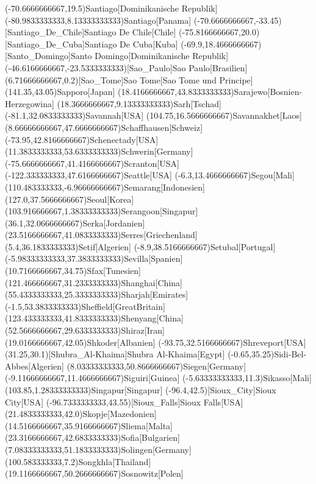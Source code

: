 \mapput(-70.6666666667,19.5){Santiago}[Dominikanische Republik]
\mapput(-80.9833333333,8.13333333333){Santiago}[Panama]
\mapput(-70.6666666667,-33.45)[Santiago_De_Chile]{Santiago De Chile}[Chile]
\mapput(-75.8166666667,20.0)[Santiago_De_Cuba]{Santiago De Cuba}[Kuba]
\mapput(-69.9,18.4666666667)[Santo_Domingo]{Santo Domingo}[Dominikanische Republik]
\mapput(-46.6166666667,-23.5333333333)[Sao_Paulo]{Sao Paulo}[Brasilien]
\mapput(6.71666666667,0.2)[Sao_Tome]{Sao Tome}[Sao Tome und Principe]
\mapput(141.35,43.05){Sapporo}[Japan]
\mapput(18.4166666667,43.8333333333){Sarajewo}[Bosnien-Herzegowina]
\mapput(18.3666666667,9.13333333333){Sarh}[Tschad]
\mapput(-81.1,32.0833333333){Savannah}[USA]
\mapput(104.75,16.5666666667){Savannakhet}[Laos]
\mapput(8.66666666667,47.6666666667){Schaffhausen}[Schweiz]
\mapput(-73.95,42.8166666667){Schenectady}[USA]
\mapput(11.3833333333,53.6333333333){Schwerin}[Germany]
\mapput(-75.6666666667,41.4166666667){Scranton}[USA]
\mapput(-122.333333333,47.6166666667){Seattle}[USA]
\mapput(-6.3,13.4666666667){Segou}[Mali]
\mapput(110.483333333,-6.96666666667){Semarang}[Indonesien]
\mapput(127.0,37.5666666667){Seoul}[Korea]
\mapput(103.916666667,1.38333333333){Serangoon}[Singapur]
\mapput(36.1,32.0666666667){Serka}[Jordanien]
\mapput(23.5166666667,41.0833333333){Serres}[Griechenland]
\mapput(5.4,36.1833333333){Setif}[Algerien]
\mapput(-8.9,38.5166666667){Setubal}[Portugal]
\mapput(-5.98333333333,37.3833333333){Sevilla}[Spanien]
\mapput(10.7166666667,34.75){Sfax}[Tunesien]
\mapput(121.466666667,31.2333333333){Shanghai}[China]
\mapput(55.4333333333,25.3333333333){Sharjah}[Emirates]
\mapput(-1.5,53.3833333333){Sheffield}[GreatBritain]
\mapput(123.433333333,41.8333333333){Shenyang}[China]
\mapput(52.5666666667,29.6333333333){Shiraz}[Iran]
\mapput(19.0166666667,42.05){Shkoder}[Albanien]
\mapput(-93.75,32.5166666667){Shreveport}[USA]
\mapput(31.25,30.1)[Shubra_Al-Khaima]{Shubra Al-Khaima}[Egypt]
\mapput(-0.65,35.25){Sidi-Bel-Abbes}[Algerien]
\mapput(8.03333333333,50.8666666667){Siegen}[Germany]
\mapput(-9.11666666667,11.4666666667){Siguiri}[Guinea]
\mapput(-5.63333333333,11.3){Sikasso}[Mali]
\mapput(103.85,1.28333333333){Singapur}[Singapur]
\mapput(-96.4,42.5)[Sioux_City]{Sioux City}[USA]
\mapput(-96.7333333333,43.55)[Sioux_Falls]{Sioux Falls}[USA]
\mapput(21.4833333333,42.0){Skopje}[Mazedonien]
\mapput(14.5166666667,35.9166666667){Sliema}[Malta]
\mapput(23.3166666667,42.6833333333){Sofia}[Bulgarien]
\mapput(7.08333333333,51.1833333333){Solingen}[Germany]
\mapput(100.583333333,7.2){Songkhla}[Thailand]
\mapput(19.1166666667,50.2666666667){Sosnowitz}[Polen]
